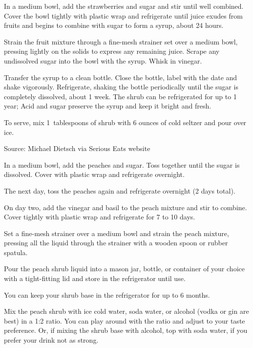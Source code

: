\documentclass[letterpaper]{recipePMG}
\newcommand{\half}{\nicefrac{1}{2} \,}
\begin{document}
\label{StrawberryShrub}


In a medium bowl, add the strawberries and sugar and stir until well combined. Cover the bowl tightly with plastic wrap and refrigerate until juice exudes from fruits and begins to combine with sugar to form a syrup, about 24 hours. 

Strain the fruit mixture through a fine-mesh strainer set over a medium bowl, pressing lightly on the solids to express any remaining juice. Scrape any undissolved sugar into the bowl with the syrup. Whisk in vinegar. 

Transfer the syrup to a clean bottle. Close the bottle, label with the date and shake vigorously. Refrigerate, shaking the bottle periodically until the sugar is completely dissolved, about 1 week. The shrub can be refrigerated for up to 1 year; Acid and sugar preserve the syrup and keep it bright and fresh. 

To serve, mix 1\half tablespoons of shrub with 6 ounces of cold seltzer and pour over ice.

Source: Michael Dietsch via Serious Eats website

\newpage
{}



In a medium bowl, add the peaches and sugar. Toss together until the sugar is dissolved. Cover with plastic wrap and refrigerate overnight. 

The next day, toss the peaches again and refrigerate overnight (2 days total). 

On day two, add the vinegar and basil to the peach mixture and stir to combine. Cover tightly with plastic wrap and refrigerate for 7 to 10 days.  

Set a fine-mesh strainer over a medium bowl and strain the peach mixture, pressing all the liquid through the strainer with a wooden spoon or rubber spatula.  

Pour the peach shrub liquid into a mason jar, bottle, or container of your choice with a tight-fitting lid and store in the refrigerator until use.  

You can keep your shrub base in the refrigerator for up to 6 months.  

Mix the peach shrub with ice cold water, soda water, or alcohol (vodka or gin are best) in a 1:2 ratio. You can play around with the ratio and adjust to your taste preference. Or, if mixing the shrub base with alcohol, top with soda water, if you prefer your drink not as strong. 
\end{document}

